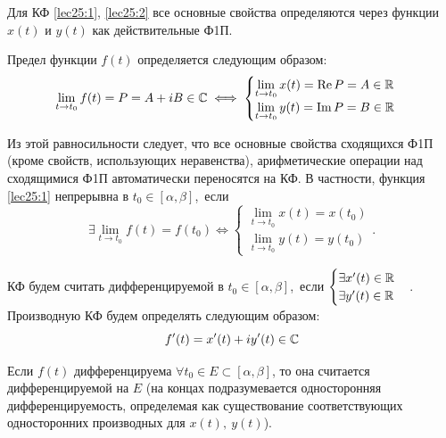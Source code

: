 \documentclass[../../main.tex]{subfiles}
\begin{document}
\hfill

Для КФ \eqref{lec25:1}, \eqref{lec25:2}  все основные свойства определяются
через функции $x(t)$ и $y(t)$ как действительные Ф1П.

Предел функции $f(t)$ определяется следующим образом: 
\[
\lim\limits_{t \to t_0}  f(t) = P = A + iB \in \mathbb{C} \iff
\begin{cases}
	\lim\limits_{t \to t_0}  x(t)  = \operatorname{Re} P = A \in \mathbb{R} \\
	\lim\limits_{t \to t_0}  y(t)  = \operatorname{Im} P = B \in \mathbb{R}
\end{cases} 
\]

Из этой равносильности следует, 
что  все основные свойства сходящихся Ф1П 
(кроме свойств, использующих неравенства),
арифметические операции над сходящимися Ф1П автоматически переносятся на КФ.
В частности, функция \eqref{lec25:1} непрерывна в $t_0 \in [\alpha,\beta ]$,\
если
\[\exists \lim\limits_{t \to t_0}  f(t) = f(t_0) \iff 
\begin{cases}
	\lim\limits_{t \to t_0}  x(t)  = x(t_0) \\
	\lim\limits_{t \to t_0}  y(t)  =  y(t_0)
\end{cases}.\]

КФ будем считать дифференцируемой в $t_0 \in [\alpha,\beta ]$,\   если 
$\begin{cases}
	\exists x'(t)  \in \mathbb{R} \\
	\exists y'(t)  \in \mathbb{R}
\end{cases}$. Производную КФ будем определять следующим образом:
\[
	f'(t) = x'(t) + iy'(t) \in \mathbb{C}
\]

Если $f(t)$ дифференцируема $\forall t_0 \in E \subset [\alpha,\beta ]$, 
то она считается дифференцируемой на $E$ (на концах 
подразумевается односторонняя дифференцируемость,
определемая как существование соответствующих 
односторонних производных для $x(t), \ y(t)$).
\end{document}
